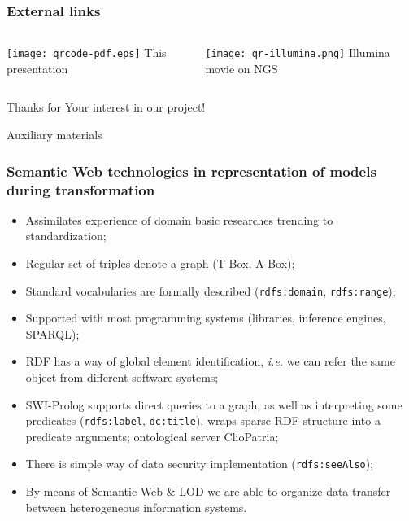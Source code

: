 \documentclass[10pt]{beamer}
\begin{document}
\begin{frame}
  \frametitle{External links}
  \begin{columns}
    \begin{column}{0.5\textwidth}\centering
      \texttt{[image: qrcode-pdf.eps]}
      This presentation
    \end{column}
    \begin{column}{0.5\textwidth}\centering
      \texttt{[image: qr-illumina.png]}
      Illumina movie on NGS
    \end{column}
  \end{columns}
\end{frame}

\begin{frame}
  \begin{center}
  \Large Thanks for Your interest in our project!
\end{center}
\end{frame}

\begin{frame}
  \begin{center}
  \Large Auxiliary materials
\end{center}
\end{frame}

\begin{frame}[fragile]
  \frametitle{Semantic Web technologies in representation of models
    during transformation}
  \begin{itemize}
  \item Assimilates experience of domain basic researches trending to standardization;
  \item Regular set of triples denote a graph (T-Box, A-Box);
  \item Standard vocabularies are formally described (\verb|rdfs:domain|, \verb|rdfs:range|);
  \item Supported with most programming systems (libraries, inference engines, SPARQL);
  \item RDF has a way of global element identification, \emph{i.e.} we can refer the same object from different software systems;
  \item SWI-Prolog supports direct queries to a graph, as well as interpreting some predicates (\verb|rdfs:label|, \verb|dc:title|), wraps sparse RDF structure into a predicate arguments; ontological server ClioPatria;
  \item There is simple way of data security implementation (\verb|rdfs:seeAlso|);
  \item By means of Semantic Web \& LOD we are able to organize data transfer between heterogeneous information systems.
  \end{itemize}
\end{frame}
\end{document}
